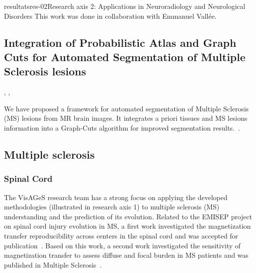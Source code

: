 \documentclass{ra2018}
\begin{document}
\begin{module}{resultats}{res-02}{Research axis 2: Applications in Neuroradiology and Neurological Disorders}
This work was done in collaboration with Emmanuel Vallée. 

\subsection{Integration of Probabilistic Atlas and Graph Cuts for Automated Segmentation of Multiple Sclerosis lesions}
\begin{participants}
      ,
      ,
\end{participants}
We have proposed a framework for automated segmentation of Multiple Sclerosis (MS) lesions
from MR brain images. It integrates a priori tissues and MS lesions information into a Graph-Cuts algorithm for improved segmentation results.~\cite{galassi:hal-01823801}.

\subsection{Multiple sclerosis}

\subsubsection{Spinal Cord}
\begin{participants}
\end{participants}
The VisAGeS research team has a strong focus on applying the developed methodologies (illustrated in research axis 1) to multiple sclerosis (MS) understanding and the prediction of its evolution. Related to the EMISEP project on spinal cord injury evolution in MS, a first work investigated the magnetization transfer reproducibility across centers in the spinal cord and was accepted for publication~\cite{combes:hal-01934605}. Based on this work, a second work investigated the sensitivity of magnetization transfer to assess diffuse and focal burden in MS patients and was published in Multiple Sclerosis~\cite{combes:hal-01934621}.


\end{module}
\end{document}
